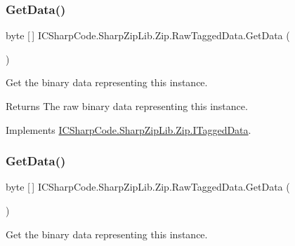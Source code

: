 \subsubsection{\texorpdfstring{Get\+Data()}{GetData()}\hspace{0.1cm}{\footnotesize\ttfamily [1/2]}}
{\footnotesize\ttfamily byte \mbox{[}$\,$\mbox{]} I\+C\+Sharp\+Code.\+Sharp\+Zip\+Lib.\+Zip.\+Raw\+Tagged\+Data.\+Get\+Data (\begin{DoxyParamCaption}{ }\end{DoxyParamCaption})\hspace{0.3cm}{\ttfamily [inline]}}



Get the binary data representing this instance. 

\begin{DoxyReturn}{Returns}
The raw binary data representing this instance.
\end{DoxyReturn}


Implements \hyperlink{interface_i_c_sharp_code_1_1_sharp_zip_lib_1_1_zip_1_1_i_tagged_data_a1534d99dec9f2bc6652875e66fba50e6}{I\+C\+Sharp\+Code.\+Sharp\+Zip\+Lib.\+Zip.\+I\+Tagged\+Data}.

\mbox{\label{class_i_c_sharp_code_1_1_sharp_zip_lib_1_1_zip_1_1_raw_tagged_data_acd58d127e920dae4d94b2e396a6fc91c}} 
\subsubsection{\texorpdfstring{Get\+Data()}{GetData()}\hspace{0.1cm}{\footnotesize\ttfamily [2/2]}}
{\footnotesize\ttfamily byte \mbox{[}$\,$\mbox{]} I\+C\+Sharp\+Code.\+Sharp\+Zip\+Lib.\+Zip.\+Raw\+Tagged\+Data.\+Get\+Data (\begin{DoxyParamCaption}{ }\end{DoxyParamCaption})\hspace{0.3cm}{\ttfamily [inline]}}



Get the binary data representing this instance. 

